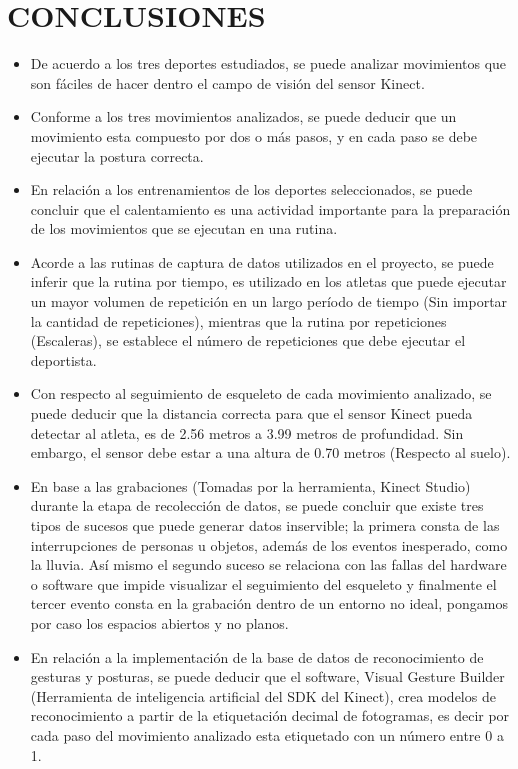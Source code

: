 \section{CONCLUSIONES} \label{ded:con}
\begin{itemize}
\item De acuerdo a los tres deportes estudiados, se puede analizar movimientos que son f\'aciles de hacer dentro el campo de visi\'on del sensor Kinect.
\item Conforme a los tres movimientos analizados, se puede deducir que un movimiento esta compuesto por dos o m\'as pasos, y en cada paso se debe ejecutar  la postura correcta.
\item En relaci\'on a los entrenamientos de los deportes seleccionados, se puede concluir que el calentamiento es una actividad importante para la preparaci\'on de los movimientos que se ejecutan en una rutina.
\item Acorde a las rutinas de captura de datos utilizados en el proyecto,  se puede inferir que la rutina por tiempo, es utilizado en los atletas que puede ejecutar un mayor volumen de repetici\'on en un largo per\'iodo de tiempo (Sin importar la cantidad de repeticiones), mientras que la rutina por repeticiones (Escaleras), se establece el n\'umero de repeticiones que debe ejecutar el deportista.
\item  Con respecto al seguimiento de esqueleto de cada movimiento analizado, se puede deducir que la distancia correcta para que el sensor Kinect pueda detectar al atleta, es de  2.56 metros a 3.99 metros de profundidad. Sin embargo, el sensor debe estar a una altura de 0.70 metros (Respecto al suelo).
\item  En base a las grabaciones (Tomadas por la herramienta, Kinect Studio) durante la etapa de recolecci\'on de datos, se puede concluir que existe tres tipos de sucesos que puede generar datos inservible; la primera consta de las interrupciones de personas u objetos, adem\'as de los eventos inesperado, como la lluvia. As\'i mismo el segundo suceso se relaciona con las fallas del hardware o software que impide visualizar el seguimiento del esqueleto y finalmente el tercer evento consta en la grabaci\'on dentro de un entorno no ideal, pongamos por caso los espacios abiertos y no planos.
\item En relaci\'on a la implementaci\'on de la base de datos de reconocimiento de gesturas y posturas, se puede deducir que el software, Visual Gesture Builder (Herramienta de inteligencia artificial del SDK del Kinect), crea modelos de reconocimiento a partir de la etiquetaci\'on decimal de fotogramas, es decir por cada paso del movimiento analizado esta etiquetado con un n\'umero entre 0 a 1.

\end{itemize}
